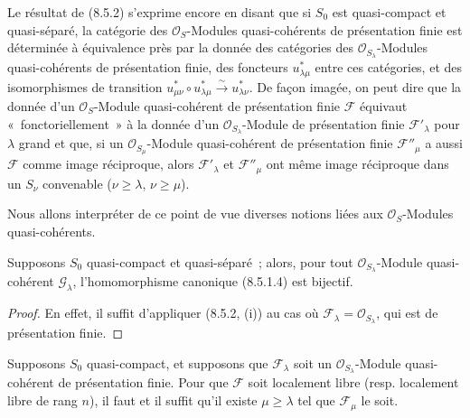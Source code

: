 \begin{scholium}[8.5.3]
\label{IV.8.5.3-fr}
Le résultat de (8.5.2) s'exprime encore en disant que si $S_0$ est
quasi-compact et quasi-séparé, la catégorie des $\mathcal O_S$-Modules
quasi-cohérents de présentation finie est déterminée à équivalence près par la
donnée des catégories des $\mathcal O_{S_\lambda}$-Modules quasi-cohérents de
présentation finie, des foncteurs $u_{\lambda\mu}^*$ entre ces catégories, et
des isomorphismes de transition
$u_{\mu\nu}^*\circ u_{\lambda\mu}^*\xrightarrow{\sim}u_{\lambda\nu}^*$. De façon
imagée, on peut dire que la donnée d'un $\mathcal O_S$-Module quasi-cohérent de
présentation finie $\mathcal F$ équivaut «~fonctoriellement~» à la donnée d'un
$\mathcal O_{S_\lambda}$-Module de présentation finie $\mathcal F'_\lambda$
pour $\lambda$ grand et que, si un $\mathcal O_{S_\mu}$-Module quasi-cohérent de
présentation finie $\mathcal F''_\mu$ a aussi $\mathcal F$ comme image
réciproque, alors $\mathcal F'_\lambda$ et $\mathcal F''_\mu$ ont même image
réciproque dans un $S_\nu$ convenable ($\nu\geq\lambda$, $\nu\geq\mu$).

Nous allons interpréter de ce point de vue diverses notions liées aux
$\mathcal O_S$-Modules quasi-cohérents.
\end{scholium}

\begin{corollary}[8.5.4]
\label{IV.8.5.4-fr}
Supposons $S_0$ quasi-compact et quasi-séparé~; alors, pour tout
$\mathcal O_{S_\lambda}$-Module quasi-cohérent $\mathcal G_\lambda$,
l'homomorphisme canonique \textup{(8.5.1.4)} est bijectif.
\end{corollary}

\begin{proof}
En effet, il suffit d'appliquer (8.5.2, (i)) au cas où
$\mathcal F_\lambda=\mathcal O_{S_\lambda}$, qui est de présentation finie.
\end{proof}

\begin{proposition}[8.5.5]
\label{IV.8.5.5-fr}
Supposons $S_0$ quasi-compact, et supposons que $\mathcal F_\lambda$ soit un
$\mathcal O_{S_\lambda}$-Module quasi-cohérent de présentation finie. Pour que
$\mathcal F$ soit localement libre (\textup{resp.} localement libre de rang $n$), il
faut et il suffit qu'il existe $\mu\geq\lambda$ tel que $\mathcal F_\mu$ le
soit.
\end{proposition}

